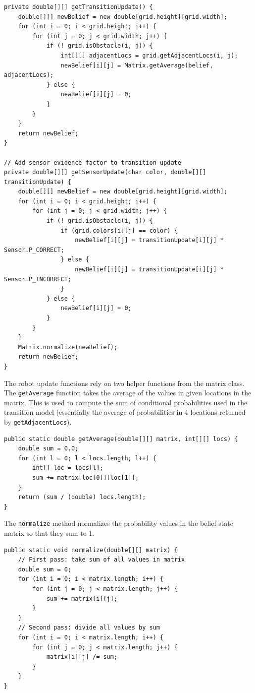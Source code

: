 \documentclass{article}
\begin{document}
\vspace{5mm}

\begin{lstlisting}
private double[][] getTransitionUpdate() {
	double[][] newBelief = new double[grid.height][grid.width];
	for (int i = 0; i < grid.height; i++) {
		for (int j = 0; j < grid.width; j++) {
			if (! grid.isObstacle(i, j)) {
				int[][] adjacentLocs = grid.getAdjacentLocs(i, j);
				newBelief[i][j] = Matrix.getAverage(belief, adjacentLocs);
			} else {
				newBelief[i][j] = 0;
			}
		}
	}
	return newBelief;
}

// Add sensor evidence factor to transition update
private double[][] getSensorUpdate(char color, double[][] transitionUpdate) {
	double[][] newBelief = new double[grid.height][grid.width];
	for (int i = 0; i < grid.height; i++) {
		for (int j = 0; j < grid.width; j++) {
			if (! grid.isObstacle(i, j)) {
				if (grid.colors[i][j] == color) {
					newBelief[i][j] = transitionUpdate[i][j] * Sensor.P_CORRECT;
				} else {
					newBelief[i][j] = transitionUpdate[i][j] * Sensor.P_INCORRECT;
				}
			} else {
				newBelief[i][j] = 0;
			}
		}
	}
	Matrix.normalize(newBelief);
	return newBelief;
}
\end{lstlisting}

The robot update functions rely on two helper functions from the matrix class. The \verb`getAverage` function takes the average of the values in given locations in the matrix. This is used to compute the sum of conditional probabilities used in the transition model (essentially the average of probabilities in 4 locations returned by \verb`getAdjacentLocs`).

\begin{lstlisting}
public static double getAverage(double[][] matrix, int[][] locs) {
	double sum = 0.0;
	for (int l = 0; l < locs.length; l++) {
		int[] loc = locs[l];
		sum += matrix[loc[0]][loc[1]];
	}
	return (sum / (double) locs.length);
}
\end{lstlisting}

The \verb`normalize` method normalizes the probability values in the belief state matrix so that they sum to 1.

\begin{lstlisting}
public static void normalize(double[][] matrix) {
	// First pass: take sum of all values in matrix
	double sum = 0;
	for (int i = 0; i < matrix.length; i++) {
		for (int j = 0; j < matrix.length; j++) {
			sum += matrix[i][j];
		}
	}
	// Second pass: divide all values by sum
	for (int i = 0; i < matrix.length; i++) {
		for (int j = 0; j < matrix.length; j++) {
			matrix[i][j] /= sum;
		}
	}
}
\end{lstlisting}
\end{document}
